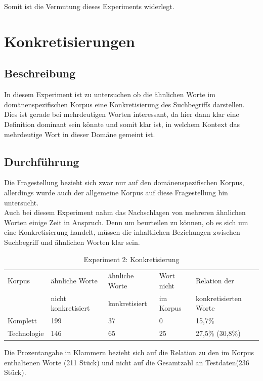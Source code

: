 \documentclass[12pt,a4paper]{report}
\begin{document}
		Somit ist die Vermutung dieses Experiments widerlegt.
		
		
	
	\section{Konkretisierungen}
		\subsection{Beschreibung}
		In diesem Experiment ist zu untersuchen ob die ähnlichen Worte im domänenspezifischen Korpus eine Konkretisierung des Suchbegriffs darstellen.\\
		Dies ist gerade bei mehrdeutigen Worten interessant, da hier dann klar eine Definition dominant sein könnte und somit klar ist, in welchem Kontext das mehrdeutige Wort in dieser Domäne gemeint ist.\\
		\subsection{Durchführung}
		Die Fragestellung bezieht sich zwar nur auf den domänenspezifischen Korpus, allerdings wurde auch der allgemeine Korpus auf diese Fragestellung hin untersucht.\\
		Auch bei diesem Experiment nahm das Nachschlagen von mehreren ähnlichen Worten einige Zeit in Anspruch. Denn um beurteilen zu können, ob es sich um eine Konkretisierung handelt, müssen die inhaltlichen Beziehungen zwischen Suchbegriff und ähnlichen Worten klar sein. \\
		
		
\begin{table}[H]
\caption{Experiment 2: Konkretisierung}
\begin{center}
\begin{tabular}{|l||l|l|l|l|}
\hline
Korpus & ähnliche Worte & ähnliche Worte  & Wort nicht  & Relation der\\
 & nicht konkretisiert & konkretisiert & im Korpus & konkretisierten Worte\\

\hline
 Komplett & 199 & 37 & 0 & 15,7\% \\
 \hline
 Technologie & 146 & 65 & 25 & 27,5\% (30,8\%)\\
 \hline
 
\end{tabular}
\end{center}
\end{table}
		Die Prozentangabe in Klammern bezieht sich auf die Relation zu den im Korpus enthaltenen Worte (211 Stück) und nicht auf die Gesamtzahl an Testdaten(236 Stück).\\
		
\end{document}
